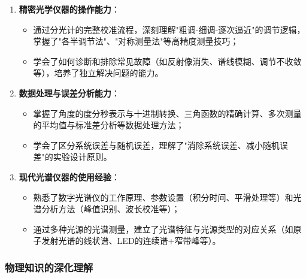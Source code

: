 \documentclass[11pt]{article}
\begin{document}
\begin{enumerate}
    \item \textbf{精密光学仪器的操作能力}：
    \begin{itemize}
        \item 通过分光计的完整校准流程，深刻理解"粗调-细调-逐次逼近"的调节逻辑，掌握了"各半调节法"、"对称测量法"等高精度测量技巧；
        \item 学会了如何诊断和排除常见故障（如反射像消失、谱线模糊、调节不收敛等），培养了独立解决问题的能力。
    \end{itemize}
    
    \item \textbf{数据处理与误差分析能力}：
    \begin{itemize}
        \item 掌握了角度的度分秒表示与十进制转换、三角函数的精确计算、多次测量的平均值与标准差分析等数据处理方法；
        \item 学会了区分系统误差与随机误差，理解了"消除系统误差、减小随机误差"的实验设计原则。
    \end{itemize}
    
    \item \textbf{现代光谱仪器的使用经验}：
    \begin{itemize}
        \item 熟悉了数字光谱仪的工作原理、参数设置（积分时间、平滑处理等）和光谱分析方法（峰值识别、波长校准等）；
        \item 通过多种光源的光谱测量，建立了光谱特征与光源类型的对应关系（如原子发射光谱的线状谱、LED的连续谱+窄带峰等）。
    \end{itemize}
\end{enumerate}

\subsubsection{物理知识的深化理解}
\end{document}
